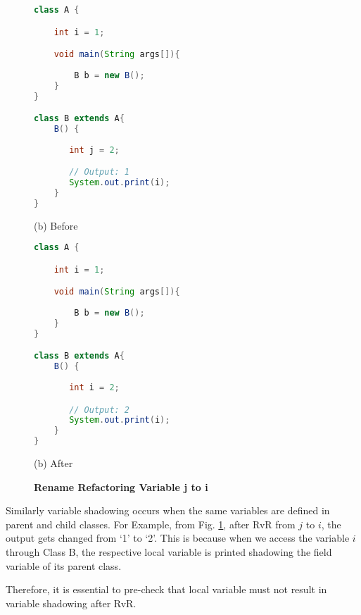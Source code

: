 \begin{figure}[th]
\centering
\begin{minipage}[t]{0.47\linewidth}
\begin{lstlisting}[language=java, basicstyle=\scriptsize\ttfamily,frame=single]
class A {

    int i = 1;

    void main(String args[]){
		
        B b = new B(); 
    }
}

class B extends A{
    B() {
    	
       int j = 2;

       // Output: 1
       System.out.print(i); 
    }
}
\end{lstlisting}
\centering(b) Before 
\end{minipage}
\hfill
\begin{minipage}[t]{0.47\linewidth}
\begin{lstlisting}[language=java, basicstyle=\scriptsize\ttfamily,frame=single]
class A {

    int i = 1;

    void main(String args[]){
		
        B b = new B(); 
    }
}

class B extends A{
    B() {
    	
       int i = 2;

       // Output: 2
       System.out.print(i); 
    }
}
\end{lstlisting}
\centering(b) After 
\end{minipage}
\caption{\textbf{Rename Refactoring Variable j to i}}
\label{figure:precond5_4}
\end{figure}



Similarly variable shadowing occurs when the same variables are defined in parent and child classes.
For Example, from Fig. \ref{figure:precond5_4}, after RvR from $j$ to $i$, the output gets changed from `1' to `2'. This is because when we access the variable $i$ through Class B, the respective local variable is printed shadowing the field variable of its parent class.

Therefore, it is essential to pre-check that local variable must not result in variable shadowing after RvR.